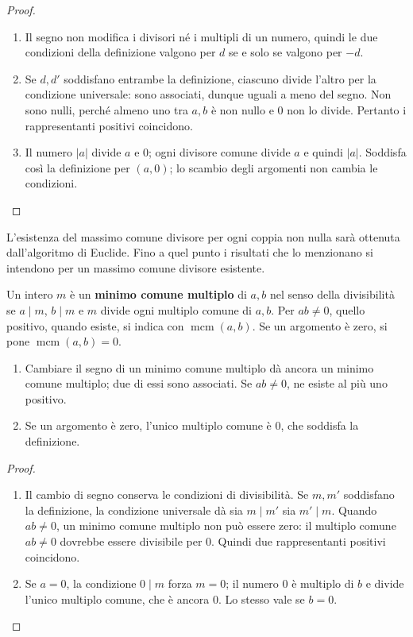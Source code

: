 \begin{proof}
\begin{enumerate}[label=\arabic*.]
\item Il segno non modifica i divisori né i multipli di un numero, quindi le due condizioni della definizione valgono per $d$ se e solo se valgono per $-d$.
\item Se $d,d'$ soddisfano entrambe la definizione, ciascuno divide l'altro per la condizione universale: sono associati, dunque uguali a meno del segno. Non sono nulli, perché almeno uno tra $a,b$ è non nullo e $0$ non lo divide. Pertanto i rappresentanti positivi coincidono.
\item Il numero $|a|$ divide $a$ e $0$; ogni divisore comune divide $a$ e quindi $|a|$. Soddisfa così la definizione per $(a,0)$; lo scambio degli argomenti non cambia le condizioni.
\end{enumerate}
\end{proof}

L'esistenza del massimo comune divisore per ogni coppia non nulla sarà ottenuta dall'algoritmo di Euclide. Fino a quel punto i risultati che lo menzionano si intendono per un massimo comune divisore esistente.

\begin{definizione}
Un intero $m$ è un \textbf{minimo comune multiplo} di $a,b$ nel senso della divisibilità se $a\mid m$, $b\mid m$ e $m$ divide ogni multiplo comune di $a,b$. Per $ab\ne0$, quello positivo, quando esiste, si indica con $\operatorname{mcm}(a,b)$. Se un argomento è zero, si pone $\operatorname{mcm}(a,b)=0$.
\end{definizione}

\begin{proposizione}
\begin{enumerate}[label=\arabic*.]
\item Cambiare il segno di un minimo comune multiplo dà ancora un minimo comune multiplo; due di essi sono associati. Se $ab\ne0$, ne esiste al più uno positivo.
\item Se un argomento è zero, l'unico multiplo comune è $0$, che soddisfa la definizione.
\end{enumerate}
\end{proposizione}
\begin{proof}
\begin{enumerate}[label=\arabic*.]
\item Il cambio di segno conserva le condizioni di divisibilità. Se $m,m'$ soddisfano la definizione, la condizione universale dà sia $m\mid m'$ sia $m'\mid m$. Quando $ab\ne0$, un minimo comune multiplo non può essere zero: il multiplo comune $ab\ne0$ dovrebbe essere divisibile per $0$. Quindi due rappresentanti positivi coincidono.
\item Se $a=0$, la condizione $0\mid m$ forza $m=0$; il numero $0$ è multiplo di $b$ e divide l'unico multiplo comune, che è ancora $0$. Lo stesso vale se $b=0$.\qedhere
\end{enumerate}
\end{proof}

